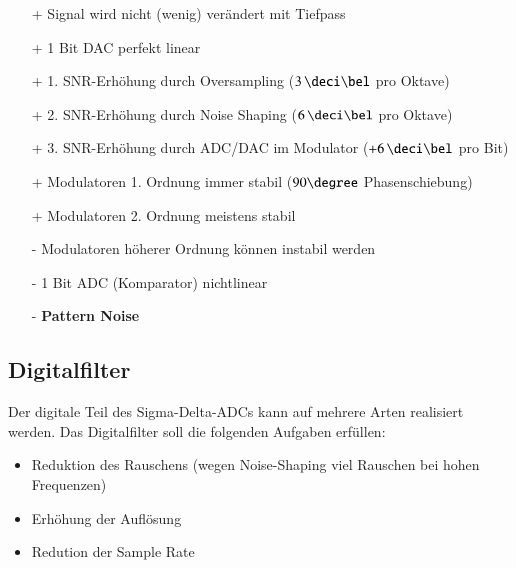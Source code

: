 \begin{minipage}[t]{0.48\columnwidth}
    \begin{itemize}
        \item[+] Signal wird nicht (wenig) verändert mit Tiefpass
        \item[+] 1 Bit DAC perfekt linear 
        \item[+] 1. SNR-Erhöhung durch Oversampling ($3 \, \deci \bel$ pro Oktave)
        \item[+] 2. SNR-Erhöhung durch Noise Shaping ($6 \, \deci \bel$ pro Oktave)
        \item[+] 3. SNR-Erhöhung durch ADC/DAC im Modulator ($+6 \, \deci \bel$ pro Bit)
    \end{itemize}
\end{minipage}
\hfill
\begin{minipage}[t]{0.48\columnwidth}
    \begin{itemize}

        \item[+] Modulatoren 1. Ordnung immer stabil ($90 \degree$ Phasenschiebung)
        \item[+] Modulatoren 2. Ordnung meistens stabil
        \item[-] Modulatoren höherer Ordnung können instabil werden  
        \item[-] 1 Bit ADC (Komparator) nichtlinear
        \item[-] \textbf{Pattern Noise} 
    \end{itemize}
\end{minipage}


\subsection{Digitalfilter}

Der digitale Teil des Sigma-Delta-ADCs kann auf mehrere Arten realisiert werden.  Das Digitalfilter soll die folgenden Aufgaben
erfüllen:

\begin{minipage}[t]{0.55\columnwidth}
    \begin{itemize}
        \item Reduktion des Rauschens (wegen Noise-Shaping viel Rauschen bei hohen Frequenzen)
    \end{itemize}
\end{minipage}
\hfill
\begin{minipage}[t]{0.42\columnwidth}
    \begin{itemize}
        \item Erhöhung der Auflösung
        \item Redution der Sample Rate
    \end{itemize}
\end{minipage}


